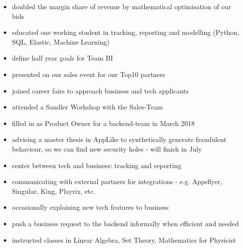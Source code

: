 \documentclass[a4paper]{twentysecondcv} %
\begin{document}
\begin{twenty} %
	{ 
    \begin{itemize}
    \item doubled the margin share of revenue by mathematical optimisation of our bids
    \item educated one working student in tracking, reporting and modelling (Python, SQL, Elastic, Machine Learning)
    \item define half year goals for Team BI
    \item presented on our sales event for our Top10 partners 
    \item joined career fairs to approach business and tech applicants
    \item attended a Sandler Workshop with the Sales-Team
    \item filled in as Product Owner for a backend-team in March 2018

    \item advising a master thesis in AppLike to synthetically generate fraudulent
    behaviour, so we can find new security holes - will finish in July 
    \end{itemize}
    }
   	{
    \begin{itemize}
    \item center between tech and business: tracking and reporting 
    \item communicating with external partners for integrations - e.g. Appsflyer, Singular, King, Playrix, etc.
    \item occasionally explaining new tech features to business
    \item push a business request to the backend informally when efficient and needed
    \end{itemize}
    }
	{
    \begin{itemize}
    \item instructed classes in Linear Algebra, Set Theory, Mathematics for Physicist
    \end{itemize}
    }
\end{twenty}

\end{document}
